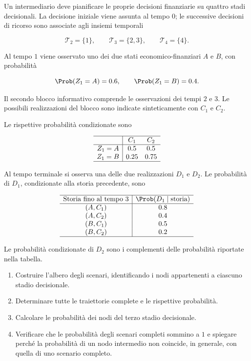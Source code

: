 \begin{exercise}

\label{ex:cap15-albero-probabilita}

Un intermediario deve pianificare le proprie
decisioni finanziarie su quattro stadi decisionali.
La decisione iniziale viene assunta al tempo $0$;
le successive decisioni di ricorso sono associate
agli insiemi temporali

\[
\mathcal T_2=\{1\},
\qquad
\mathcal T_3=\{2,3\},
\qquad
\mathcal T_4=\{4\}.
\]

Al tempo $1$ viene osservato uno dei due stati
economico-finanziari $A$ e $B$, con probabilit\`a

\[
\Prob(Z_1=A)=0.6,
\qquad
\Prob(Z_1=B)=0.4.
\]

Il secondo blocco informativo comprende
le osservazioni dei tempi $2$ e $3$.
Le possibili realizzazioni del blocco
sono indicate sinteticamente con $C_1$ e $C_2$.

Le rispettive probabilit\`a condizionate sono

\[
\begin{array}{c|cc}
\hline
 & C_1 & C_2\\
\hline
Z_1=A & 0.5 & 0.5\\
Z_1=B & 0.25 & 0.75\\
\hline
\end{array}
\]

Al tempo terminale si osserva
una delle due realizzazioni $D_1$ e $D_2$.
Le probabilit\`a di $D_1$,
condizionate alla storia precedente, sono

\[
\begin{array}{c|c}
\hline
\text{Storia fino al tempo }3
&
\Prob(D_1\mid\text{storia})\\
\hline
(A,C_1)&0.8\\
(A,C_2)&0.4\\
(B,C_1)&0.5\\
(B,C_2)&0.2\\
\hline
\end{array}
\]

Le probabilit\`a condizionate di $D_2$
sono i complementi delle probabilit\`a
riportate nella tabella.

\begin{enumerate}

\item Costruire l'albero degli scenari,
identificando i nodi appartenenti
a ciascuno stadio decisionale.

\item Determinare tutte le traiettorie complete
e le rispettive probabilit\`a.

\item Calcolare le probabilit\`a dei nodi
del terzo stadio decisionale.

\item Verificare che le probabilit\`a
degli scenari completi sommino a $1$
e spiegare perch\'{e} la probabilit\`a
di un nodo intermedio non coincide,
in generale, con quella di uno scenario completo.

\end{enumerate}

\end{exercise}

